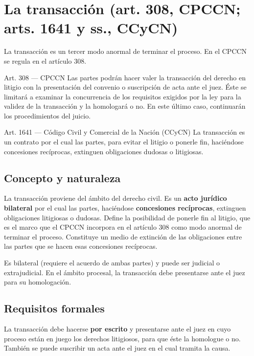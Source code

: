 \documentclass[12pt,oneside]{book}
\begin{document}
\section{La transacción (art. 308, CPCCN; arts. 1641 y ss., CCyCN)}

La transacción es un tercer modo anormal de terminar el proceso. En el CPCCN se regula en el artículo 308.

\begin{articulo}{Art. 308 --- CPCCN}
Las partes podrán hacer valer la transacción del derecho en litigio con la presentación del convenio o suscripción de acta ante el juez. Éste se limitará a examinar la concurrencia de los requisitos exigidos por la ley para la validez de la transacción y la homologará o no. En este último caso, continuarán los procedimientos del juicio.
\end{articulo}

\begin{articulo}{Art. 1641 --- Código Civil y Comercial de la Nación (CCyCN)}
La transacción es un contrato por el cual las partes, para evitar el litigio o ponerle fin, haciéndose concesiones recíprocas, extinguen obligaciones dudosas o litigiosas.
\end{articulo}

\subsection{Concepto y naturaleza}

La transacción proviene del ámbito del derecho civil. Es un \textbf{acto jurídico bilateral} por el cual las partes, haciéndose \textbf{concesiones recíprocas}, extinguen obligaciones litigiosas o dudosas. Define la posibilidad de ponerle fin al litigio, que es el marco que el CPCCN incorpora en el artículo 308 como modo anormal de terminar el proceso. Constituye un medio de extinción de las obligaciones entre las partes que se hacen esas concesiones recíprocas.

Es bilateral (requiere el acuerdo de ambas partes) y puede ser judicial o extrajudicial. En el ámbito procesal, la transacción debe presentarse ante el juez para su homologación.

\subsection{Requisitos formales}

La transacción debe hacerse \textbf{por escrito} y presentarse ante el juez en cuyo proceso están en juego los derechos litigiosos, para que éste la homologue o no. También se puede suscribir un acta ante el juez en el cual tramita la causa.
\end{document}
